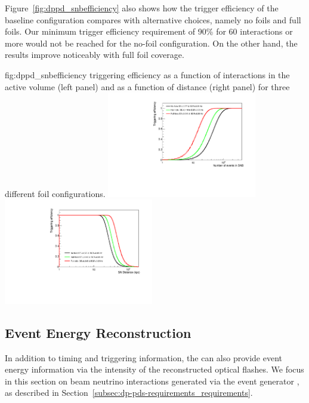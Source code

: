 Figure~\ref{fig:dppd_snbefficiency} also shows how the  trigger efficiency of the baseline configuration compares with alternative choices, namely no foils and full foils. Our minimum  trigger efficiency requirement of \num{90}\% for \num{60}  interactions or more would not be reached for the no-foil configuration. On the other hand, the results improve noticeably with full foil coverage. 

\begin{dunefigure}{fig:dppd_snbefficiency}
     { triggering efficiency as a function of  interactions in the active volume (left panel) and as a function of  distance (right panel) for three different  foil configurations.}
     \includegraphics[width=0.49\textwidth]{graphics/dppd_snbefficiency_vs_snevents.pdf} \hfill
    \includegraphics[width=0.49\textwidth]{graphics/dppd_snbefficiency_vs_sndistance.pdf}
    \end{dunefigure}


\subsection{Event Energy Reconstruction}
\label{subsec:dp-pds-performance_calorimetry}

In addition to timing and triggering information, the  can also provide event energy information via the intensity of the reconstructed optical flashes. We focus in this section on beam neutrino interactions generated via the  event generator \cite{Andreopoulos:2009rq}, as described in Section~\ref{subsec:dp-pds-requirements_requirements}.

